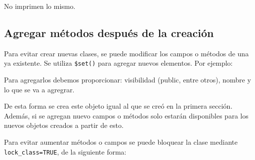 \documentclass[
]{book}
\newenvironment{Shaded}{\begin{snugshade}}{\end{snugshade}}
\newcommand{\AttributeTok}[1]{\textcolor[rgb]{0.13,0.29,0.53}{#1}}
\newcommand{\ConstantTok}[1]{\textcolor[rgb]{0.56,0.35,0.01}{#1}}
\newcommand{\ControlFlowTok}[1]{\textcolor[rgb]{0.13,0.29,0.53}{\textbf{#1}}}
\newcommand{\DecValTok}[1]{\textcolor[rgb]{0.00,0.00,0.81}{#1}}
\newcommand{\FunctionTok}[1]{\textcolor[rgb]{0.13,0.29,0.53}{\textbf{#1}}}
\newcommand{\NormalTok}[1]{#1}
\newcommand{\OtherTok}[1]{\textcolor[rgb]{0.56,0.35,0.01}{#1}}
\newcommand{\SpecialCharTok}[1]{\textcolor[rgb]{0.81,0.36,0.00}{\textbf{#1}}}
\newcommand{\StringTok}[1]{\textcolor[rgb]{0.31,0.60,0.02}{#1}}
\begin{document}
No imprimen lo mismo.

\hypertarget{agregar-muxe9todos-despuuxe9s-de-la-creaciuxf3n}{%
\subsection{Agregar métodos después de la creación}\label{agregar-muxe9todos-despuuxe9s-de-la-creaciuxf3n}}

Para evitar crear nuevas clases, se puede modificar los campos o métodos de una ya existente. Se utiliza \texttt{\$set()} para agregar nuevos elementos. Por ejemplo:

\begin{Shaded}
\end{Shaded}

Para agregarlos debemos proporcionar: visibilidad (public, entre otros), nombre y lo que se va a agregrar.

De esta forma se crea este objeto igual al que se creó en la primera sección. Además, si se agregan nuevo campos o métodos solo estarán disponibles para los nuevos objetos creados a partir de esto.

Para evitar aumentar métodos o campos se puede bloquear la clase mediante \texttt{lock\_class=TRUE}, de la siguiente forma:

\begin{Shaded}
\end{Shaded}
\end{document}
